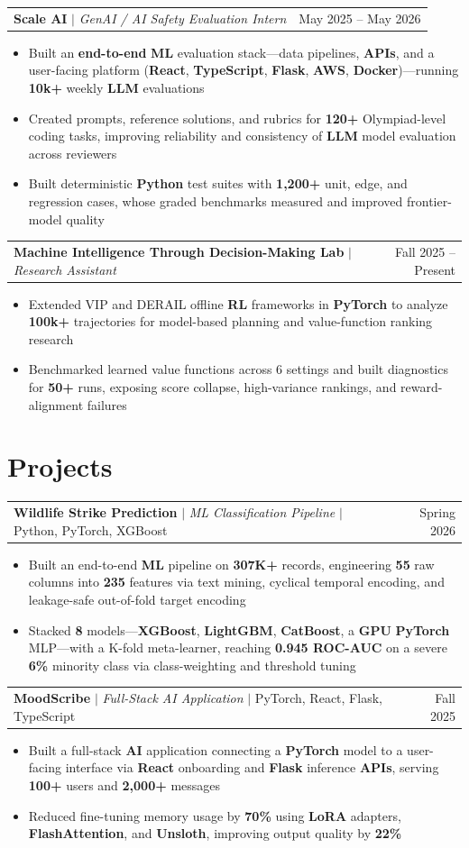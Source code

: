 \documentclass[letterpaper,10pt]{article}
\makeatletter
\newcommand{\resumeWorkHeading}[2]{%
  \vspace{2pt}\noindent
  \begin{tabular*}{\textwidth}{@{}l@{\extracolsep{\fill}}r@{}}
    #1 & #2 \\
  \end{tabular*}%
  \vspace{-2pt}
}
\newcommand{\resumeItemListStart}{\begin{itemize}}
\newcommand{\resumeItemListEnd}{\end{itemize}\vspace{3pt}}
\newcommand{\resumeItem}[1]{\item #1}
\makeatother
\begin{document}
\resumeWorkHeading
{\textbf{Scale AI} $|$ \emph{GenAI / AI Safety Evaluation Intern}}{May 2025 -- May 2026}
\resumeItemListStart
\resumeItem{Built an \textbf{end-to-end} \textbf{ML} evaluation stack---data pipelines, \textbf{APIs}, and a user-facing platform (\textbf{React}, \textbf{TypeScript}, \textbf{Flask}, \textbf{AWS}, \textbf{Docker})---running \textbf{10k+} weekly \textbf{LLM} evaluations}
\resumeItem{Created prompts, reference solutions, and rubrics for \textbf{120+} Olympiad-level coding tasks, improving reliability and consistency of \textbf{LLM} model evaluation across reviewers}
\resumeItem{Built deterministic \textbf{Python} test suites with \textbf{1,200+} unit, edge, and regression cases, whose graded benchmarks measured and improved frontier-model quality}
\resumeItemListEnd

\resumeWorkHeading
{\textbf{Machine Intelligence Through Decision-Making Lab} $|$ \emph{Research Assistant}}{Fall 2025 -- Present}
\resumeItemListStart
\resumeItem{Extended VIP and DERAIL offline \textbf{RL} frameworks in \textbf{PyTorch} to analyze \textbf{100k+} trajectories for model-based planning and value-function ranking research}
\resumeItem{Benchmarked learned value functions across 6 settings and built diagnostics for \textbf{50+} runs, exposing score collapse, high-variance rankings, and reward-alignment failures}
\resumeItemListEnd

\section{Projects}
\resumeWorkHeading
{\textbf{Wildlife Strike Prediction} $|$ \emph{ML Classification Pipeline} $|$ Python, PyTorch, XGBoost}{Spring 2026}
\resumeItemListStart
\resumeItem{Built an end-to-end \textbf{ML} pipeline on \textbf{307K+} records, engineering \textbf{55} raw columns into \textbf{235} features via text mining, cyclical temporal encoding, and leakage-safe out-of-fold target encoding}
\resumeItem{Stacked \textbf{8} models---\textbf{XGBoost}, \textbf{LightGBM}, \textbf{CatBoost}, a \textbf{GPU} \textbf{PyTorch} MLP---with a K-fold meta-learner, reaching \textbf{0.945 ROC-AUC} on a severe \textbf{6\%} minority class via class-weighting and threshold tuning}
\resumeItemListEnd

\resumeWorkHeading
{\textbf{MoodScribe} $|$ \emph{Full-Stack AI Application} $|$ PyTorch, React, Flask, TypeScript}{Fall 2025}
\resumeItemListStart
\resumeItem{Built a full-stack \textbf{AI} application connecting a \textbf{PyTorch} model to a user-facing interface via \textbf{React} onboarding and \textbf{Flask} inference \textbf{APIs}, serving \textbf{100+} users and \textbf{2,000+} messages}
\resumeItem{Reduced fine-tuning memory usage by \textbf{70\%} using \textbf{LoRA} adapters, \textbf{FlashAttention}, and \textbf{Unsloth}, improving output quality by \textbf{22\%}}
\resumeItemListEnd
\end{document}
